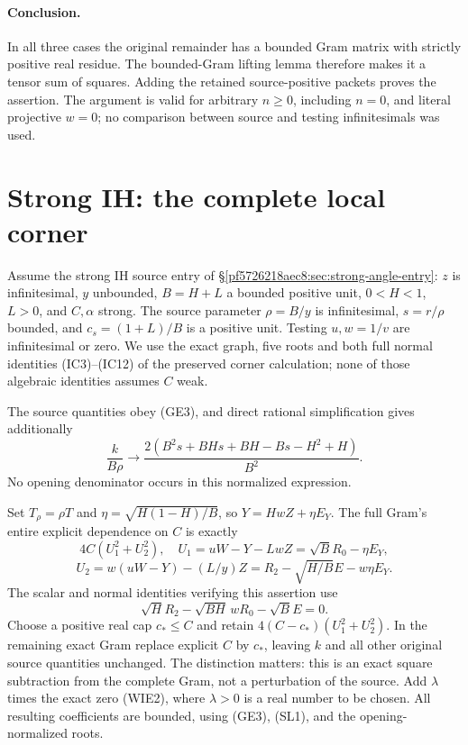 \paragraph{Conclusion.}
In all three cases the original remainder has a bounded Gram matrix with
strictly positive real residue.  The bounded-Gram lifting lemma therefore
makes it a tensor sum of squares.  Adding the retained source-positive
packets proves the assertion.  The argument is valid for arbitrary $n\geq0$,
including $n=0$, and literal projective $w=0$; no comparison between source
and testing infinitesimals was used.


\section{\texorpdfstring{Strong IH: the complete local corner}{Strong IH: the complete local corner}}
\label{component:pf3e0ca8bf054}

\label{pf3e0ca8bf054:sec:strong-ih-local}
Assume the strong IH source entry of \S\ref{pf5726218aec8:sec:strong-angle-entry}:
$z$ is infinitesimal, $y$ unbounded, $B=H+L$ a bounded positive unit,
$0<H<1$, $L>0$, and $C,\alpha$ strong. The source parameter
$\rho=B/y$ is infinitesimal, $s=r/\rho$ bounded, and $c_s=(1+L)/B$
is a positive unit. Testing $u,w=1/v$ are infinitesimal or zero.
We use the exact graph, five roots and both full normal identities
(IC3)--(IC12) of the preserved corner calculation; none of those
algebraic identities assumes $C$ weak.

The source quantities obey (GE3), and direct rational simplification
gives additionally
\[
 \frac{k}{B\rho}\longrightarrow
 \frac{2(B^2s+BHs+BH-Bs-H^2+H)}{B^2}.
\tag{SL1}
\]
No opening denominator occurs in this normalized expression.

Set $T_\rho=\rho T$ and
$\eta=\sqrt{H(1-H)/B}$, so $Y=HwZ+\eta E_Y$.
The full Gram's entire explicit dependence on $C$ is exactly
\[
 4C(U_1^2+U_2^2),\quad
 U_1=uW-Y-LwZ=\sqrt B R_0-\eta E_Y,
\]
\[
 U_2=w(uW-Y)-(L/y)Z
       =R_2-\sqrt{H/B}E-w\eta E_Y.
\tag{SL2}
\]
The scalar and normal identities verifying this assertion use
\[
 \sqrt H R_2-\sqrt{BH}\,wR_0-\sqrt B E=0.
\tag{SL3}
\]
Choose a positive real cap $c_*\le C$ and retain
$4(C-c_*)(U_1^2+U_2^2)$. In the remaining exact Gram replace explicit
$C$ by $c_*$, leaving $k$ and all other original source quantities
unchanged. The distinction matters: this is an exact square
subtraction from the complete Gram, not a perturbation of the source.
Add $\lambda$ times the exact zero (WIE2), where $\lambda>0$ is a
real number to be chosen. All resulting coefficients are bounded,
using (GE3), (SL1), and the opening-normalized roots.

